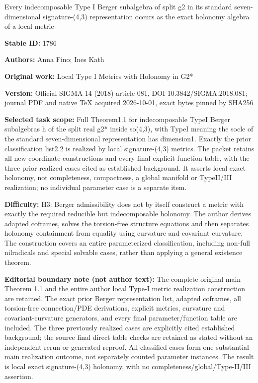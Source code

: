 \documentclass[11pt]{article}
\numberwithin{equation}{section}
\begin{document}
\begin{center}\Large Every indecomposable Type I Berger subalgebra of split g2 in its standard seven-dimensional signature-(4,3) representation occurs as the exact holonomy algebra of a local metric\end{center}
\noindent\textbf{Stable ID:} 1786\par
\noindent\textbf{Authors:} Anna Fino; Ines Kath\par
\noindent\textbf{Original work:} Local Type I Metrics with Holonomy in G2*\allowbreak{}\par
\noindent\textbf{Version:} Official SIGMA 14 (2018) article 081, DOI 10.3842/SIGMA.2018.081; journal PDF and native TeX acquired 2026-10-01, exact bytes pinned by SHA256\par
\noindent\textbf{Selected task scope:} Full Theorem1.1 for indecomposable TypeI Berger subalgebras h of the split real g2*\allowbreak{} inside so(4,3), with TypeI meaning the socle of the standard seven-dimensional representation has dimension1. Exactly the prior classification list2.2 is realized by local signature-(4,3) metrics. The packet retains all new coordinate constructions and every final explicit function table, with the three prior realized cases cited as established background. It asserts local exact holonomy, not completeness, compactness, a global manifold or TypeII/III realization; no individual parameter case is a separate item.\par
\noindent\textbf{Difficulty:} H3: Berger admissibility does not by itself construct a metric with exactly the required reducible but indecomposable holonomy. The author derives adapted coframes, solves the torsion-free structure equations and then separates holonomy containment from equality using curvature and covariant curvature. The construction covers an entire parameterized classification, including non-full nilradicals and special solvable cases, rather than applying a general existence theorem.\par
\noindent\textbf{Editorial boundary note (not author text):} The complete original main Theorem 1.1 and the entire author local Type-I metric realization construction are retained. The exact prior Berger representation list, adapted coframes, all torsion-free connection/PDE derivations, explicit metrics, curvature and covariant-curvature generators, and every final parameter/function table are included. The three previously realized cases are explicitly cited established background; the source final direct table checks are retained as stated without an independent rerun or generated reproof. All classified cases form one substantial main realization outcome, not separately counted parameter instances. The result is local exact signature-(4,3) holonomy, with no completeness/global/Type-II/III assertion.\par
\end{document}
